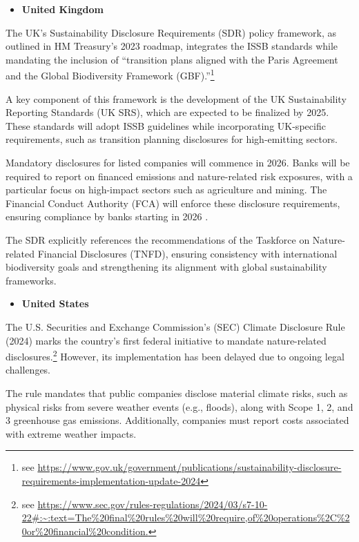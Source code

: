 \documentclass[
  authoryear]{elsarticle}
\providecommand{\tightlist}{%
  \setlength{\itemsep}{0pt}\setlength{\parskip}{0pt}}\usepackage{longtable,booktabs,array}
\begin{document}
\begin{itemize}
\tightlist
\item
  \textbf{United Kingdom}
\end{itemize}

The UK's Sustainability Disclosure Requirements (SDR) policy framework,
as outlined in HM Treasury's 2023 roadmap, integrates the ISSB standards
while mandating the inclusion of ``transition plans aligned with the
Paris Agreement and the Global Biodiversity Framework
(GBF).''\footnote{see
  \url{https://www.gov.uk/government/publications/sustainability-disclosure-requirements-implementation-update-2024}}

A key component of this framework is the development of the UK
Sustainability Reporting Standards (UK SRS), which are expected to be
finalized by 2025. These standards will adopt ISSB guidelines while
incorporating UK-specific requirements, such as transition planning
disclosures for high-emitting sectors.

Mandatory disclosures for listed companies will commence in 2026. Banks
will be required to report on financed emissions and nature-related risk
exposures, with a particular focus on high-impact sectors such as
agriculture and mining. The Financial Conduct Authority (FCA) will
enforce these disclosure requirements, ensuring compliance by banks
starting in 2026 \citep[see][]{FCA2023}.

The SDR explicitly references the recommendations of the Taskforce on
Nature-related Financial Disclosures (TNFD), ensuring consistency with
international biodiversity goals and strengthening its alignment with
global sustainability frameworks.

\begin{itemize}
\tightlist
\item
  \textbf{United States}
\end{itemize}

The U.S. Securities and Exchange Commission's (SEC) Climate Disclosure
Rule (2024) marks the country's first federal initiative to mandate
nature-related disclosures.\footnote{see
  \url{https://www.sec.gov/rules-regulations/2024/03/s7-10-22\#:~:text=The\%20final\%20rules\%20will\%20require,of\%20operations\%2C\%20or\%20financial\%20condition.}}
However, its implementation has been delayed due to ongoing legal
challenges.

The rule mandates that public companies disclose material climate risks,
such as physical risks from severe weather events (e.g., floods), along
with Scope 1, 2, and 3 greenhouse gas emissions. Additionally, companies
must report costs associated with extreme weather impacts.
\end{document}
